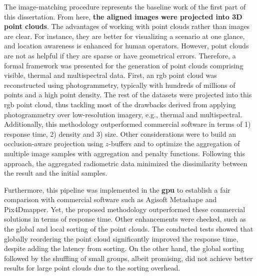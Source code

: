 The image-matching procedure represents the baseline work of the first part of this dissertation. From here, \textbf{the aligned images were projected into 3D point clouds}. The advantages of working with point clouds rather than images are clear. For instance, they are better for visualizing a scenario at one glance, and location awareness is enhanced for human operators. However, point clouds are not as helpful if they are sparse or have geometrical errors. Therefore, a formal framework was presented for the generation of point clouds comprising visible, thermal and multispectral data. First, an \acrshort{rgb} point cloud was reconstructed using photogrammetry, typically with hundreds of millions of points and a high point density. The rest of the datasets were projected into this \acrshort{rgb} point cloud, thus tackling most of the drawbacks derived from applying photogrammetry over low-resolution imagery, e.g., thermal and multispectral. Additionally, this methodology outperformed commercial software in terms of 1) response time, 2) density and 3) size. Other considerations were to build an occlusion-aware projection using $z$-buffers and to optimize the aggregation of multiple image samples with aggregation and penalty functions. Following this approach, the aggregated radiometric data minimized the dissimilarity between the result and the initial samples. 

Furthermore, this pipeline was implemented in the \textbf{\acrshort{gpu}} to establish a fair comparison with commercial software such as Agisoft Metashape and Pix4Dmapper. Yet, the proposed methodology outperformed these commercial solutions in terms of response time. Other enhancements were checked, such as the global and local sorting of the point clouds. The conducted tests showed that globally reordering the point cloud significantly improved the response time, despite adding the latency from sorting. On the other hand, the global sorting followed by the shuffling of small groups, albeit promising, did not achieve better results for large point clouds due to the sorting overhead. 

